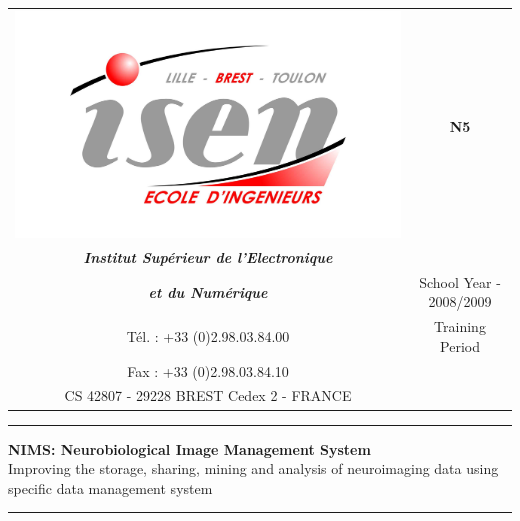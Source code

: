 \documentclass[a4paper,11pt]{report}
\begin{document}
\begin{titlepage}

\begin{center}

\begin{tabular*}{\textwidth}[c]{@{\extracolsep{\fill}}cc}
\includegraphics[scale=0.25]{images/logo_ISEN.jpg}& {\textbf{\Huge N5}}\\
{\small \textbf{\textit{Institut Sup\'erieur de l'Electronique}}} \\
{\small \textbf{\textit{et du Num\'erique}}} & {\large School Year - 2008/2009}\\
{\footnotesize T\'el. : +33 (0)2.98.03.84.00}& {\large Training Period}\\
{\footnotesize Fax : +33 (0)2.98.03.84.10} \\ 
{\footnotesize CS 42807 - 29228 BREST Cedex 2 - FRANCE}
\end{tabular*}
\end{center}
\bigskip
\bigskip

\hrule
\bigskip
\begin{center}
{\textbf{\Large NIMS: Neurobiological Image Management System}}\\{\large Improving the storage, sharing, mining and analysis of neuroimaging data using specific data management system}
\end{center}
\bigskip
\hrule
\bigskip


\end{titlepage}
\end{document}
